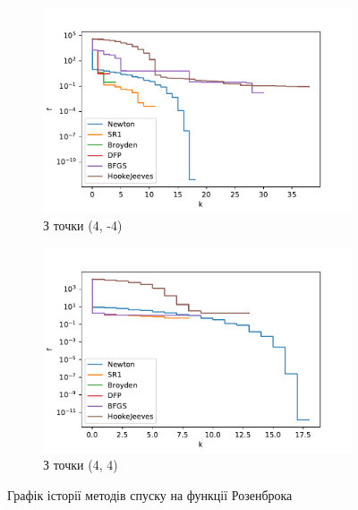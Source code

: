 \begin{figure}
    \ContinuedFloat
    \begin{subfigure}{0.5\textwidth}
        \includegraphics[width=\textwidth, trim=0cm 0cm 1.2cm 0.7cm, clip]{assets/descent_steps/rosenbrock_steps_2.pdf}
        \caption{З точки (4, -4)}
    \end{subfigure}
    \begin{subfigure}{0.5\textwidth}
        \includegraphics[width=\textwidth, trim=0cm 0cm 1.2cm 1cm, clip]{assets/descent_steps/rosenbrock_steps_3.pdf}
        \caption{З точки (4, 4)}
    \end{subfigure}
    \caption{Графік історії методів спуску на функції Розенброка}
\end{figure}

